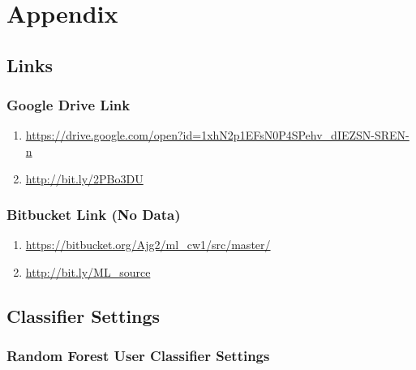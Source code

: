 \section{Appendix}
\label{sec:appendix}

\subsection{Links}
\label{sec:appendix:links}

\subsubsection{Google Drive Link}
\label{sec:appenfix:links:gdrive}
\begin{enumerate}
    \item \url{https://drive.google.com/open?id=1xhN2p1EFsN0P4SPehv_dIEZSN-SREN-n}
    \item \url{http://bit.ly/2PBo3DU} 
\end{enumerate}

\subsubsection{Bitbucket Link (No Data)}
\label{sec:appenfix:links:bitbucket}
\begin{enumerate}
    \item \url{https://bitbucket.org/Ajg2/ml_cw1/src/master/}
    \item \url{http://bit.ly/ML\_source} 
\end{enumerate}


\FloatBarrier
\subsection{Classifier Settings}
\label{sec:appendix:classifier}


\FloatBarrier
\subsubsection{Random Forest User Classifier Settings}
\label{sec:appendix:classifier:rfucs}

